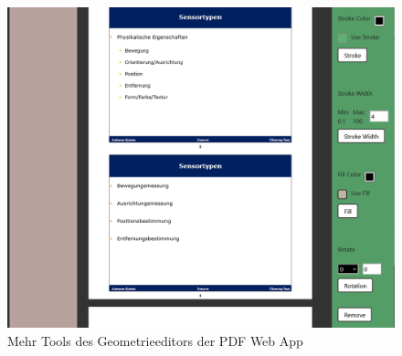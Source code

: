 \begin{figure}[!htbp]
	\centering
	\includegraphics[width=1\textwidth]{"images/shaper2.png"}
	\caption{Mehr Tools des Geometrieeditors der PDF Web App}
	\label{fig:shaper2}
\end{figure}

